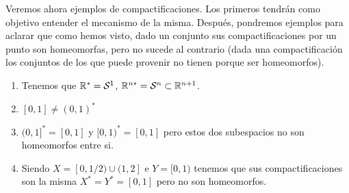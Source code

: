 \begin{exa}
	Veremos ahora ejemplos de compactificaciones. Los primeros tendrán como objetivo entender el mecanismo de la misma. Después, pondremos ejemplos para aclarar que como hemos visto, dado un conjunto sus compactificaciones por un punto son homeomorfas, pero no sucede al contrario (dada una compactificación los conjuntos de los que puede provenir no tienen porque ser homeomorfos). 
	\begin{enumerate}
		\item Tenemos que $\mathbb{R}^*=\mathcal{S}^1$, $\mathbb{R}^{n*}=\mathcal{S}^n\subset \mathbb{R}^{n+1}$.
		\item $[0,1]\ne(0,1)^*$
		\item $(0,1]^*=[0,1]$ y $[0,1)^*=[0,1]$ pero estos dos subespacios no son homeomorfos entre si.
		\item Siendo $X=[0,1/2)\cup(1,2]$ e $Y=[0,1)$ tenemos que sus compactificaciones son la misma $X^*=Y^*=[0,1]$ pero no son homeomorfos.
	\end{enumerate}
\end{exa}

